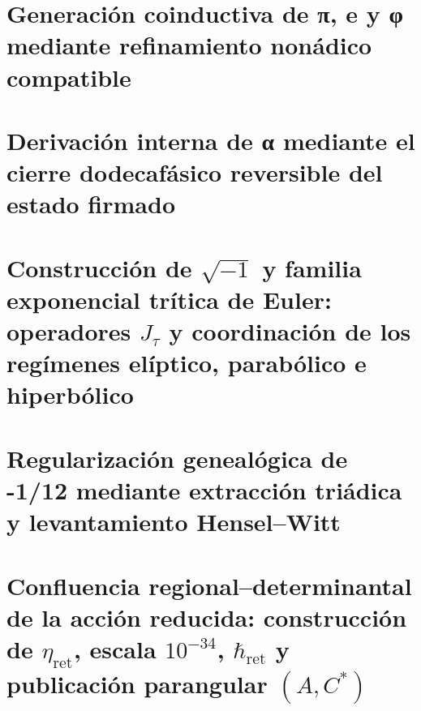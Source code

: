 \chapter{Generación coinductiva de π, e y φ mediante refinamiento nonádico compatible}
\label{chap:sucesor-102-10}



\chapter{Derivación interna de α mediante el cierre dodecafásico reversible del estado firmado}
\label{chap:sucesor-102-11}


\chapter{Construcción de \texorpdfstring{\(\sqrt{-1}\)}{√(−1)} y familia exponencial trítica de Euler: operadores \texorpdfstring{\(J_\tau\)}{J_τ} y coordinación de los regímenes elíptico, parabólico e hiperbólico}
\label{chap:sucesor-102-12}


\chapter{Regularización genealógica de -1/12 mediante extracción triádica y levantamiento Hensel–Witt}
\label{chap:sucesor-102-13}


\chapter{Confluencia regional–determinantal de la acción reducida: construcción de \texorpdfstring{\(\eta_{\mathrm{ret}}\)}{η_ret}, escala \texorpdfstring{\(10^{-34}\)}{10⁻³⁴}, \texorpdfstring{\(\hbar_{\mathrm{ret}}\)}{ℏ_ret} y publicación parangular \texorpdfstring{\((A,C^*)\)}{(A,C*)}}
\label{chap:sucesor-102-14}




